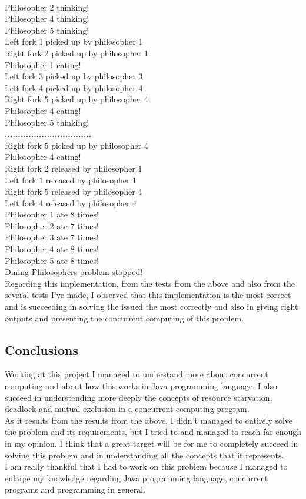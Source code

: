 \documentclass[14pt]{article}
\begin{document}
\\Philosopher 2 thinking!
\\Philosopher 4 thinking!
\\Philosopher 5 thinking!
\\Left fork 1 picked up by philosopher 1
\\Right fork 2 picked up by philosopher 1
\\Philosopher 1 eating!
\\Left fork 3 picked up by philosopher 3
\\Left fork 4 picked up by philosopher 4
\\Right fork 5 picked up by philosopher 4
\\Philosopher 4 eating!
\\Philosopher 5 thinking!
\\\textbf{.................................}
\\Right fork 5 picked up by philosopher 4
\\Philosopher 4 eating!
\\Right fork 2 released by philosopher 1
\\Left fork 1 released by philosopher 1
\\Right fork 5 released by philosopher 4
\\Left fork 4 released by philosopher 4
\\Philosopher 1 ate 8 times!
\\Philosopher 2 ate 7 times!
\\Philosopher 3 ate 7 times!
\\Philosopher 4 ate 8 times!
\\Philosopher 5 ate 8 times!
\\Dining Philosophers problem stopped!
\vspace{2.5 mm}
\\Regarding this implementation, from the tests from the above and also from the several tests I've made, I observed that this implementation is the most correct and is succeeding in solving the issued the most correctly and also in giving right outputs and presenting the concurrent computing of this problem. 
\subsection{Conclusions}
Working at this project I managed to understand more about concurrent computing and about how this works in Java programming language. I also succeed in understanding more deeply the concepts of resource starvation, deadlock and mutual exclusion in a concurrent computing program.
\vspace{2.5 mm}
\\As it results from the results from the above, I didn't managed to entirely solve the problem and its requirements, but I tried to and managed to reach far enough in my opinion. I think that a great target will be for me to completely succeed in solving this problem and in understanding all the concepts that it represents.
\vspace{2.5 mm}
\\I am really thankful that I had to work on this problem because I managed to enlarge my knowledge regarding Java programming language, concurrent programs and programming in general.
\newpage
\end{document}

